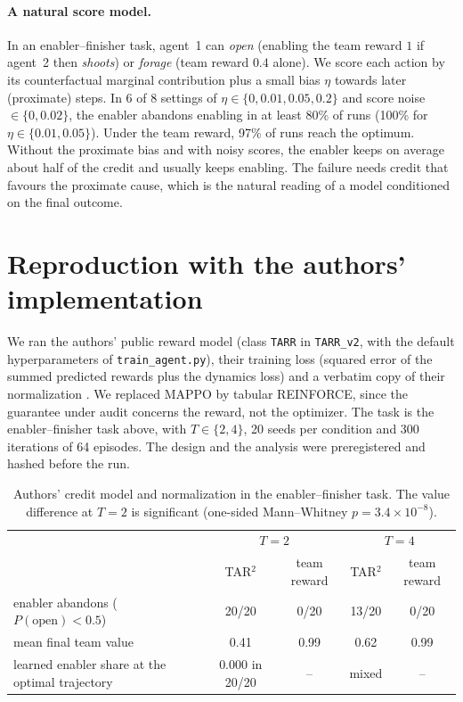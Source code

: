 \documentclass[11pt]{article}
\theoremstyle{remark}
\begin{document}
\paragraph{A natural score model.} In an enabler--finisher task, agent~1 can \emph{open} (enabling the team reward $1$ if agent~2 then \emph{shoots}) or \emph{forage} (team reward $0.4$ alone). We score each action by its counterfactual marginal contribution plus a small bias $\eta$ towards later (proximate) steps. In 6 of 8 settings of $\eta\in\{0,0.01,0.05,0.2\}$ and score noise $\in\{0,0.02\}$, the enabler abandons enabling in at least 80\% of runs (100\% for $\eta\in\{0.01,0.05\}$). Under the team reward, 97\% of runs reach the optimum. Without the proximate bias and with noisy scores, the enabler keeps on average about half of the credit and usually keeps enabling. The failure needs credit that favours the proximate cause, which is the natural reading of a model conditioned on the final outcome.

\section{Reproduction with the authors' implementation}\label{sec:repro}

\sloppy We ran the authors' public reward model (class \texttt{TARR} in \texttt{TARR\_v2}, with the default hyperparameters of \texttt{train\_agent.py}), their training loss (squared error of the summed predicted rewards plus the dynamics loss) and a verbatim copy of their normalization \citep[commit 883173c0]{kapoor2024code}. We replaced MAPPO by tabular REINFORCE, since the guarantee under audit concerns the reward, not the optimizer. The task is the enabler--finisher task above, with $T\in\{2,4\}$, 20 seeds per condition and 300 iterations of 64 episodes. The design and the analysis were preregistered and hashed before the run.

\begin{table}[h]\centering\small
\begin{tabular}{lcccc}\toprule
& \multicolumn{2}{c}{$T=2$} & \multicolumn{2}{c}{$T=4$}\\
& TAR$^2$ & team reward & TAR$^2$ & team reward\\\midrule
enabler abandons ($P(\text{open})<0.5$) & 20/20 & 0/20 & 13/20 & 0/20\\
mean final team value & 0.41 & 0.99 & 0.62 & 0.99\\
learned enabler share at the optimal trajectory & 0.000 in 20/20 & -- & mixed & --\\\bottomrule
\end{tabular}
\caption{Authors' credit model and normalization in the enabler--finisher task. The value difference at $T=2$ is significant (one-sided Mann--Whitney $p=3.4\times10^{-8}$).}
\end{table}
\end{document}

